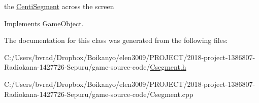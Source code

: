 the \mbox{\hyperlink{class_centi_segment}{Centi\+Segment}} across the screen 

Implements \mbox{\hyperlink{class_game_object_a4bc279e0b3da8273e4e869cc7584847d}{Game\+Object}}.



The documentation for this class was generated from the following files\+:\begin{DoxyCompactItemize}
\item 
C\+:/\+Users/bvrad/\+Dropbox/\+Boikanyo/elen3009/\+P\+R\+O\+J\+E\+C\+T/2018-\/project-\/1386807-\/\+Radiokana-\/1427726-\/\+Sepuru/game-\/source-\/code/\mbox{\hyperlink{_csegment_8h}{Csegment.\+h}}\item 
C\+:/\+Users/bvrad/\+Dropbox/\+Boikanyo/elen3009/\+P\+R\+O\+J\+E\+C\+T/2018-\/project-\/1386807-\/\+Radiokana-\/1427726-\/\+Sepuru/game-\/source-\/code/Csegment.\+cpp\end{DoxyCompactItemize}
